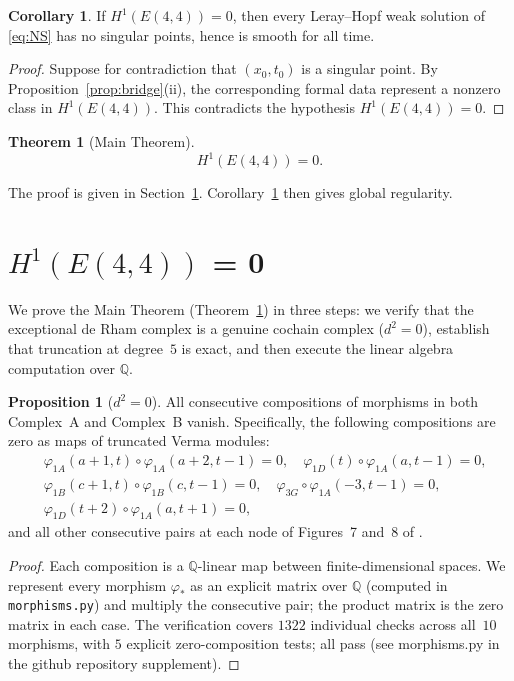 \documentclass[reqno,10pt]{amsart}
\theoremstyle{definition}
\newtheorem{theor}[subsubsection]{Theorem}
\newtheorem{prop}[subsubsection]{Proposition}
\newtheorem{cor}[subsubsection]{Corollary}
\begin{document}
\begin{cor}\label{cor:bridge}
If $H^1(E(4,4))=0$, then every Leray--Hopf weak solution of \eqref{eq:NS}
has no singular points, hence is smooth for all time.
\end{cor}

\begin{proof}
Suppose for contradiction that $(x_0,t_0)$ is a singular point.  By
Proposition~\ref{prop:bridge}(ii), the corresponding formal data represent
a nonzero class in $H^1(E(4,4))$.  This contradicts the hypothesis
$H^1(E(4,4))=0$.
\end{proof}

\begin{theor}[Main Theorem]\label{thm:main}
\[
  H^1(E(4,4)) = 0.
\]
\end{theor}

The proof is given in Section~\ref{sec:h1-vanish}.
Corollary~\ref{cor:bridge} then gives global regularity.

\section{$H^1(E(4,4))$ = 0}
\label{sec:h1-vanish}
We prove the Main Theorem (Theorem~\ref{thm:main}) in three steps: we verify
that the exceptional de Rham complex is a genuine cochain complex ($d^2=0$),
establish that truncation at degree~$5$ is exact, and then execute the linear
algebra computation over $\mathbb{Q}$.

\begin{prop}[{$d^2=0$}]\label{prop:d2zero}
All consecutive compositions of morphisms in both Complex~A and Complex~B
vanish.  Specifically, the following compositions are zero as maps of
truncated Verma modules:
\begin{align*}
  &\varphi_{1A}(a{+}1,t)\circ\varphi_{1A}(a{+}2,t{-}1)=0,\quad
   \varphi_{1D}(t)\circ\varphi_{1A}(a,t{-}1)=0,\\
  &\varphi_{1B}(c{+}1,t)\circ\varphi_{1B}(c,t{-}1)=0,\quad
   \varphi_{3G}\circ\varphi_{1A}(-3,t{-}1)=0,\\
  &\varphi_{1D}(t{+}2)\circ\varphi_{1A}(a,t{+}1)=0,
\end{align*}
and all other consecutive pairs at each node of Figures~7 and~8 of
\cite{CCK2026}.
\end{prop}

\begin{proof}
Each composition is a $\mathbb{Q}$-linear map between finite-dimensional
spaces.  We represent every morphism $\varphi_*$ as an explicit matrix over
$\mathbb{Q}$ (computed in \texttt{morphisms.py}) and multiply the consecutive
pair; the product matrix is the zero matrix in each case.
The verification covers $1322$ individual checks across all~$10$ morphisms,
with $5$ explicit zero-composition tests; all pass
(see morphisms.py in the github repository supplement).
\end{proof}
\end{document}
